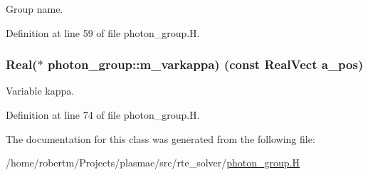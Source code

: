 Group name. 



Definition at line 59 of file photon\+\_\+group.\+H.

\subsubsection[{\texorpdfstring{m\+\_\+varkappa}{m_varkappa}}]{\setlength{\rightskip}{0pt plus 5cm}Real($\ast$ photon\+\_\+group\+::m\+\_\+varkappa) (const Real\+Vect a\+\_\+pos)\hspace{0.3cm}{\ttfamily [protected]}}\hypertarget{classphoton__group_a053d549d0eb6000b0e6ee45e6215ebcf}{}\label{classphoton__group_a053d549d0eb6000b0e6ee45e6215ebcf}


Variable kappa. 



Definition at line 74 of file photon\+\_\+group.\+H.



The documentation for this class was generated from the following file\+:\begin{DoxyCompactItemize}
\item 
/home/robertm/\+Projects/plasmac/src/rte\+\_\+solver/\hyperlink{photon__group_8H}{photon\+\_\+group.\+H}\end{DoxyCompactItemize}
